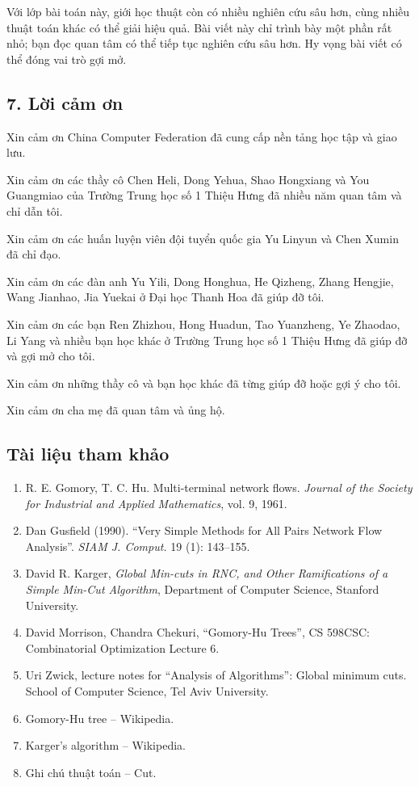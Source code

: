 \documentclass[11pt]{article}
\begin{document}
Với lớp bài toán này, giới học thuật còn có nhiều nghiên cứu sâu hơn, cùng
nhiều thuật toán khác có thể giải hiệu quả. Bài viết này chỉ trình bày một
phần rất nhỏ; bạn đọc quan tâm có thể tiếp tục nghiên cứu sâu hơn. Hy vọng
bài viết có thể đóng vai trò gợi mở.

\subsection*{7. Lời cảm ơn}

Xin cảm ơn China Computer Federation đã cung cấp nền tảng học tập và giao lưu.

Xin cảm ơn các thầy cô Chen Heli, Dong Yehua, Shao Hongxiang và You Guangmiao
của Trường Trung học số 1 Thiệu Hưng đã nhiều năm quan tâm và chỉ dẫn tôi.

Xin cảm ơn các huấn luyện viên đội tuyển quốc gia Yu Linyun và Chen Xumin đã
chỉ đạo.

Xin cảm ơn các đàn anh Yu Yili, Dong Honghua, He Qizheng, Zhang Hengjie, Wang
Jianhao, Jia Yuekai ở Đại học Thanh Hoa đã giúp đỡ tôi.

Xin cảm ơn các bạn Ren Zhizhou, Hong Huadun, Tao Yuanzheng, Ye Zhaodao, Li
Yang và nhiều bạn học khác ở Trường Trung học số 1 Thiệu Hưng đã giúp đỡ và
gợi mở cho tôi.

Xin cảm ơn những thầy cô và bạn học khác đã từng giúp đỡ hoặc gợi ý cho tôi.

Xin cảm ơn cha mẹ đã quan tâm và ủng hộ.

\subsection*{Tài liệu tham khảo}

\begin{enumerate}
  \item R. E. Gomory, T. C. Hu. Multi-terminal network flows. \emph{Journal of
  the Society for Industrial and Applied Mathematics}, vol. 9, 1961.
  \item Dan Gusfield (1990). ``Very Simple Methods for All Pairs Network Flow
  Analysis''. \emph{SIAM J. Comput.} 19 (1): 143--155.
  \item David R. Karger, \emph{Global Min-cuts in RNC, and Other Ramifications
  of a Simple Min-Cut Algorithm}, Department of Computer Science, Stanford
  University.
  \item David Morrison, Chandra Chekuri, ``Gomory-Hu Trees'', CS 598CSC:
  Combinatorial Optimization Lecture 6.
  \item Uri Zwick, lecture notes for ``Analysis of Algorithms'': Global minimum
  cuts. School of Computer Science, Tel Aviv University.
  \item Gomory-Hu tree -- Wikipedia.
  \item Karger's algorithm -- Wikipedia.
  \item Ghi chú thuật toán -- Cut.
\end{enumerate}
\end{document}
